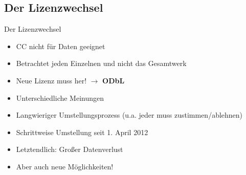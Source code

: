 \documentclass{beamer}
\begin{document}
\subsection{Der Lizenzwechsel}

\begin{frame}{Der Lizenzwechsel}
    \pause
    \begin{itemize}
        \item CC nicht für Daten geeignet
        \item Betrachtet jeden Einzelnen und nicht das Gesamtwerk
    \end{itemize}

    \pause

    \begin{itemize}
        \item Neue Lizenz muss her! $\rightarrow$ \textbf{ODbL}
    \end{itemize}

    \pause

    \begin{itemize}
        \item Unterschiedliche Meinungen
        \item Langwieriger Umstellungsprozess (u.a. jeder muss zustimmen/ablehnen)
        \item Schrittweise Umstellung seit 1. April 2012
    \end{itemize}

    \pause

    \begin{itemize}
        \item Letztendlich: Großer Datenverlust
        \item Aber auch neue Möglichkeiten!
    \end{itemize}
\end{frame}
\end{document}
